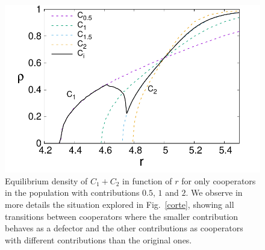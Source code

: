 \documentclass[twocolumn,aps,amsmath,pre,floatfix,superscriptaddress]{revtex4-2}
\begin{document}
\begin{figure}[h]
    \centering
    \includegraphics[width=\linewidth]{apbb-eps-converted-to.pdf}
    \caption{Equilibrium density of $C_{1}+C_{2}$ in function of $r$ for only cooperators in the population with contributions $0.5$, $1$ and $2$.  We observe in more details the situation explored in Fig.~\ref{corte}, showing all transitions between cooperators where the smaller contribution behaves as a defector and the other contributions as cooperators with different contributions than the original ones.  }
    \label{app}
\end{figure}
\end{document}

